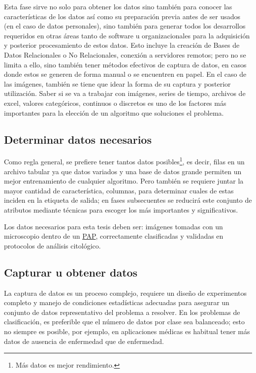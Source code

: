 Esta fase sirve no solo para obtener los datos sino también para conocer las
características de los datos así como su preparación previa antes de ser usados
(en el caso de datos personales), sino también para generar todos los
desarrollos requeridos en otras áreas tanto de software u organizacionales para
la adquisición y posterior procesamiento de estos datos. Esto incluye la
creación de Bases de Datos Relacionales o No Relacionales, conexión a servidores
remotos; pero no se limita a ello, sino también tener métodos efectivos de
captura de datos, en casos donde estos se generen de forma manual o se
encuentren en papel. En el caso de las imágenes, también se tiene que idear la
forma de su captura y posterior utilización. Saber si se va a trabajar con
imágenes, series de tiempo, archivos de excel, valores categóricos, continuos o
discretos es uno de los factores más importantes para la elección de un
algoritmo que soluciones el problema. 

\subsection{Determinar datos necesarios}

Como regla general, se prefiere tener tantos datos posibles\footnote{Más datos
es mejor rendimiento.}, es decir, filas en un archivo tabular ya que datos
variados y una base de datos grande permiten un mejor entrenamiento de cualquier
algoritmo. Pero también se requiere juntar la mayor cantidad de característica,
columnas, para determinar cuales de estas inciden en la etiqueta de salida; en
fases subsecuentes se reducirá este conjunto de atributos mediante técnicas para
escoger los más importantes y significativos.

Los datos necesarios para esta tesis deben ser: imágenes tomadas con un
microscopio dentro de un \hyperlink{abbr}{PAP}, correctamente clasificadas y
validadas en protocolos de análisis citológico.

\subsection{Capturar u obtener datos}

La captura de datos es un proceso complejo, requiere un diseño de experimentos
completo y manejo de condiciones estadísticas adecuadas para asegurar un
conjunto de datos representativo del problema a resolver. En los problemas de
clasificación, es preferible que el número de datos por clase sea balanceado;
esto no siempre es posible, por ejemplo, en aplicaciones médicas es habitual
tener más datos de ausencia de enfermedad que de enfermedad.

